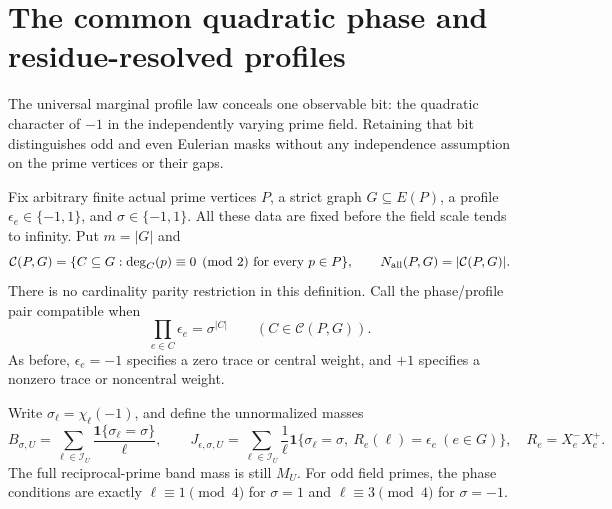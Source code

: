 \documentclass[11pt]{article}
\begin{document}
\section{The common quadratic phase and residue-resolved profiles}
\label{sec:native-phase-profiles}

The universal marginal profile law conceals one observable bit: the
quadratic character of \(-1\) in the independently varying prime field.
Retaining that bit distinguishes odd and even Eulerian masks without
any independence assumption on the prime vertices or their gaps.

Fix arbitrary finite actual prime vertices \(P\), a strict graph
\(G\subseteq E(P)\), a profile \(\epsilon_e\in\{-1,1\}\), and
\(\sigma\in\{-1,1\}\). All these data are fixed before the field scale
tends to infinity. Put \(m=|G|\) and
\[
 \mathcal C(P,G)=\{C\subseteq G:\deg_C(p)\equiv0\pmod2
                              \text{ for every }p\in P\},
 \qquad N_{\rm all}(P,G)=|\mathcal C(P,G)|.
\]
There is no cardinality parity restriction in this definition.
Call the phase/profile pair compatible when
\begin{equation}\label{eq:native-phase-compatible}
 \prod_{e\in C}\epsilon_e=\sigma^{|C|}
                   \qquad(C\in\mathcal C(P,G)).
\end{equation}
As before, \(\epsilon_e=-1\) specifies a zero trace or central weight,
and \(+1\) specifies a nonzero trace or noncentral weight.

Write \(\sigma_\ell=\chi_\ell(-1)\), and define the unnormalized masses
\[
 B_{\sigma,U}=\sum_{\ell\in\mathcal I_U}
       \frac{\mathbf1\{\sigma_\ell=\sigma\}}{\ell},\qquad
 J_{\epsilon,\sigma,U}=\sum_{\ell\in\mathcal I_U}\frac1\ell
       \mathbf1\{\sigma_\ell=\sigma,\
                         R_e(\ell)=\epsilon_e\ (e\in G)\},
 \quad R_e=X^-_eX^+_e.
\]
The full reciprocal-prime band mass is still \(M_U\).
For odd field primes, the phase conditions are exactly
\(\ell\equiv1\pmod4\) for \(\sigma=1\) and
\(\ell\equiv3\pmod4\) for \(\sigma=-1\).
\end{document}
